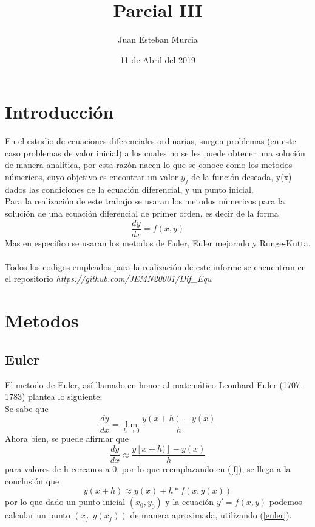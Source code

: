\documentclass[12pt]{article}
\begin{document}
\title{Parcial III}
\author{Juan Esteban Murcia}
\date{11 de Abril del 2019}
\maketitle


\section{Introducción}
En el estudio de ecuaciones diferenciales ordinarias, surgen problemas (en este caso problemas de valor inicial) a los cuales no se les puede obtener una solución de manera analitica, por esta razón nacen lo que se conoce como los metodos númericos, cuyo objetivo es encontrar un valor $y_{f}$ de la función deseada, y(x) dados las condiciones de la ecuación diferencial, y un punto inicial.\\
Para la realización de este trabajo se usaran los metodos númericos para la solución de una ecuación diferencial de primer orden, es decir de la forma
\begin{equation}
\frac{dy}{dx} = f(x,y)
\label{f}
\end{equation}
Mas en especifico se usaran los metodos de Euler, Euler mejorado y Runge-Kutta.\\\\
Todos los codigos empleados para la realización de este informe se encuentran en el repositorio \textit{https://github.com/JEMN20001/Dif\_Equ}
\section{Metodos}
\subsection{Euler}
El metodo de Euler, así llamado en honor al matemático Leonhard Euler (1707-1783) plantea lo siguiente:\\

Se sabe que $$\frac{dy}{dx} = \lim\limits_{h\to0}\frac{y(x+h)-y(x)}{h}$$
Ahora bien, se puede afirmar que $$\frac{dy}{dx} \approx \frac{y[x+h)]-y(x)}{h}$$ para valores de h cercanos a 0, por lo que reemplazando en (\ref{f}), se llega a la conclusión que
\begin{equation}
 y(x+h) \approx y(x)+h*f(x,y(x))
 \label{euler}
\end{equation}
por lo que dado un punto inicial $(x_{0},y_{0})$ y la ecuación $y' = f(x,y)$ podemos calcular un punto $(x_{f},y(x_{f}))$ de manera aproximada, utilizando (\ref{euler}).
\end{document}
